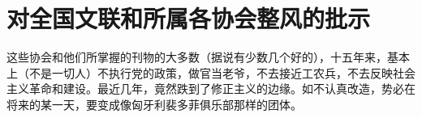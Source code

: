 \section[对全国文联和所属各协会整风的批示（一九六四年六月二十七日）]{对全国文联和所属各协会整风的批示}


这些协会和他们所掌握的刊物的大多数（据说有少数几个好的），十五年来，基本上（不是一切人）不执行党的政策，做官当老爷，不去接近工农兵，不去反映社会主义革命和建设。最近几年，竟然跌到了修正主义的边缘。如不认真改造，势必在将来的某一天，要变成像匈牙利裴多菲俱乐部那样的团体。

